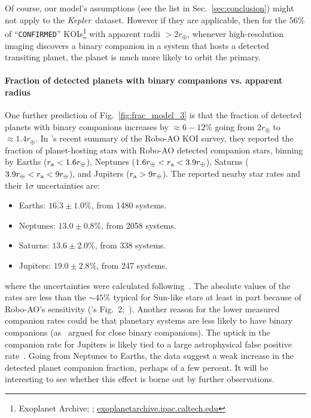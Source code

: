 \documentclass[12pt,modern]{aastex61}
\renewcommand{\a}{_{\rm a}}
\begin{document}
Of course, our model's assumptions (see the list in Sec.~\ref{sec:conclusion}) 
might not apply to the {\it Kepler}\ dataset.
However if they are applicable, then for the $56\%$ of ``\texttt{CONFIRMED}'' 
KOIs\footnote{Exoplanet Archive; \cite{akeson_nasa_2013}; 
    \url{exoplanetarchive.ipac.caltech.edu}} with 
apparent radii $>2r_\oplus$, 
whenever high-resolution imaging 
discovers a binary companion in 
a system that hosts a detected transiting planet, the planet is much
more likely to orbit the primary.


\paragraph{Fraction of detected planets with binary companions vs. apparent 
radius}
One further prediction of Fig.~\ref{fig:frac_model_3} is that the fraction of 
detected planets with binary companions increases by $\approx 6-12\%$ going 
from $2r_\oplus$ to $\approx\! 1.4r_\oplus$.
In \citet{ziegler_robo-ao_2017}'s recent summary of the Robo-AO KOI survey, 
they reported the fraction of planet-hosting stars with Robo-AO detected 
companion stars, binning by Earths ($r\a < 1.6r_\oplus$), Neptunes 
($1.6r_\oplus < r\a < 3.9 r_\oplus$), Saturns ($3.9r_\oplus < r\a < 9 
r_\oplus$), and Jupiters ($r\a > 9r_\oplus$).
The reported nearby star rates and their $1\sigma$ uncertainties are:
\begin{itemize}
    \item Earths: $16.3 \pm 1.0\%$, from 1480 systems.
    \item Neptunes: $13.0 \pm 0.8\%$, from 2058 systems.
    \item Saturns: $13.6 \pm 2.0\%$, from 338 systems.
    \item Jupiters: $19.0 \pm 2.8\%$, from 247 systems.
\end{itemize} 
where the uncertainties were calculated 
following~\citet{burgasser_binarity_2003}.
The absolute values of the rates are less than the $\sim\! 45\%$ typical for 
Sun-like stars at least in part because of Robo-AO's sensitivity 
(\citealt{ziegler_robo-ao_2017}'s Fig.~2;~\citealt{raghavan_survey_2010}).
Another reason for the lower measured companion rates could be that planetary 
systems are less likely to have 
binary companions (as~\citealt{kraus_impact_2016} argued for close binary 
companions).
The uptick in the companion rate for Jupiters is likely tied to a large 
astrophysical false positive rate~\citep{santerne_sophie_2012}.
Going from Neptunes to Earths, the data suggest a weak increase in the 
detected planet companion fraction, perhaps of a few percent.
It will be interesting to see whether this effect is borne out by further 
observations.
\end{document}

